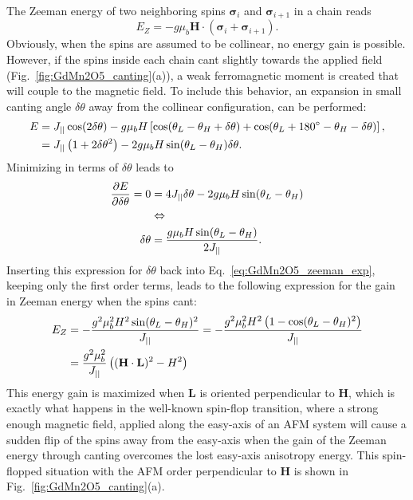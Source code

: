 The Zeeman energy of two neighboring spins $\pmb{\sigma}_{i}$ and $\pmb{\sigma}_{i+1}$ in a chain reads
\begin{equation}
	E_Z = -g \mu_b \mathbf{H} \cdot (\pmb{\sigma}_i + \pmb{\sigma}_{i+1})\nonumber.
\end{equation}
Obviously, when the spins are assumed to be collinear, no energy gain is possible. However, if the spins inside each chain cant slightly towards the applied field (Fig.~\ref{fig:GdMn2O5_canting}(a)), a weak ferromagnetic moment is created that will couple to the magnetic field. To include this behavior, an expansion in small canting angle $\delta \theta$ away from the collinear configuration, can be performed:
\begin{align}
	E &= J_{||} \cos(2\delta \theta) - g \mu_b H \left[\cos(\theta_L - \theta_H + \delta \theta) + \cos(\theta_L + 180^\circ - \theta_H - \delta \theta)\right],\nonumber\\
	&= J_{||} \left( 1+2\delta\theta^2 \right) - 2 g \mu_b H \sin(\theta_L - \theta_H)\delta\theta \label{eq:GdMn2O5_zeeman_exp}.
\end{align}
Minimizing in terms of $\delta \theta$ leads to
\begin{align}
	\frac{\partial E}{\partial \delta \theta} = 0 &= 4 J_{||} \delta \theta - 2 g \mu_b H \sin(\theta_L - \theta_H) \nonumber\\
	&\Leftrightarrow \nonumber\\
	\delta \theta &= \frac{g\mu_b H \sin(\theta_L - \theta_H)}{2 J_{||}}.\nonumber
\end{align}
Inserting this expression for $\delta \theta$ back into Eq.~\ref{eq:GdMn2O5_zeeman_exp}, keeping only the first order terms, leads to the following expression for the gain in Zeeman energy when the spins cant:
\begin{align}
	E_Z &= -\frac{g^2\mu_b^2 H^2 \sin(\theta_L - \theta_H)^2}{J_{||}} = -\frac{g^2\mu_b^2 H^2 \left(1 - \cos(\theta_L - \theta_H)^2\right)}{J_{||}} \nonumber\\
	&=\frac{g^2\mu_b^2}{J_{||}}\left((\mathbf{H}\cdot\mathbf{L})^2 - H^2\right)\nonumber
\end{align}
This energy gain is maximized when $\mathbf{L}$ is oriented perpendicular to $\mathbf{H}$, which is exactly what happens in the well-known spin-flop transition, where a strong enough magnetic field, applied along the easy-axis of an AFM system will cause a sudden flip of the spins away from the easy-axis when the gain of the Zeeman energy through canting overcomes the lost easy-axis anisotropy energy. This spin-flopped situation with the AFM order perpendicular to $\mathbf{H}$ is shown in Fig.~\ref{fig:GdMn2O5_canting}(a).

